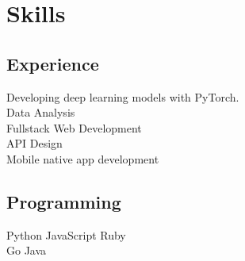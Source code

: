 \documentclass[]{deedy-resume-openfont}
\begin{document}
%
%

%
%



%
%

\begin{minipage}[t]{0.25\textwidth}




\section{Skills}
\subsection{Experience}
Developing deep learning models with PyTorch. \\
Data Analysis\\
Fullstack Web Development\\
API Design\\
Mobile native app development
\sectionsep


\subsection{Programming}
Python \textbullet{}  JavaScript \textbullet{} Ruby \\
Go \textbullet{}  Java \\
\sectionsep


\end{minipage}
\end{document}
